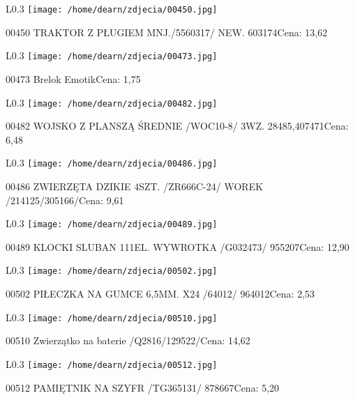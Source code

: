 \begin{wrapfigure}{L}{0.3\textwidth}
\texttt{[image: /home/dearn/zdjecia/00450.jpg]}
\end{wrapfigure}
00450 TRAKTOR Z PŁUGIEM MNJ./5560317/  NEW.           603174Cena: 13,62\newline
\begin{wrapfigure}{L}{0.3\textwidth}
\texttt{[image: /home/dearn/zdjecia/00473.jpg]}
\end{wrapfigure}
00473 Brelok EmotikCena: 1,75\newline
\begin{wrapfigure}{L}{0.3\textwidth}
\texttt{[image: /home/dearn/zdjecia/00482.jpg]}
\end{wrapfigure}
00482 WOJSKO Z PLANSZĄ ŚREDNIE /WOC10-8/  3WZ.  28485,407471Cena: 6,48\newline
\begin{wrapfigure}{L}{0.3\textwidth}
\texttt{[image: /home/dearn/zdjecia/00486.jpg]}
\end{wrapfigure}
00486 ZWIERZĘTA DZIKIE 4SZT. /ZR666C-24/  WOREK /214125/305166/Cena: 9,61\newline
\begin{wrapfigure}{L}{0.3\textwidth}
\texttt{[image: /home/dearn/zdjecia/00489.jpg]}
\end{wrapfigure}
00489 KLOCKI SLUBAN 111EL. WYWROTKA /G032473/         955207Cena: 12,90\newline
\begin{wrapfigure}{L}{0.3\textwidth}
\texttt{[image: /home/dearn/zdjecia/00502.jpg]}
\end{wrapfigure}
00502 PIŁECZKA NA GUMCE 6,5MM. X24 /64012/            964012Cena: 2,53\newline
\begin{wrapfigure}{L}{0.3\textwidth}
\texttt{[image: /home/dearn/zdjecia/00510.jpg]}
\end{wrapfigure}
00510 Zwierzątko na baterie /Q2816/129522/Cena: 14,62\newline
\begin{wrapfigure}{L}{0.3\textwidth}
\texttt{[image: /home/dearn/zdjecia/00512.jpg]}
\end{wrapfigure}
00512 PAMIĘTNIK NA SZYFR  /TG365131/                  878667Cena: 5,20\newline
